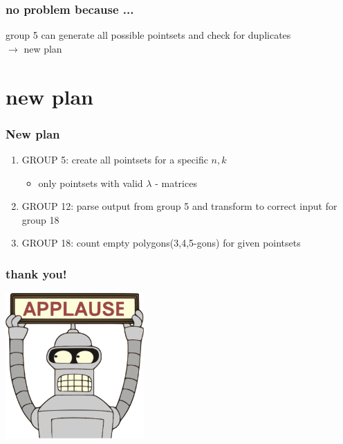 \documentclass{beamer}
\begin{document}
\begin{frame}
\frametitle{no problem because ...}
group 5 can generate all possible pointsets and check for duplicates\\
$\rightarrow$ new plan
\end{frame}

\section{new plan}
\begin{frame}
\frametitle{New plan}
\begin{enumerate}
\item GROUP 5: create all pointsets for a specific $n,k$
  \begin{itemize}
  \item only pointsets with valid $\lambda$ - matrices
  \end{itemize}
\item GROUP 12: parse output from group 5 and transform to correct input for group 18
\item GROUP 18: count empty polygons(3,4,5-gons) for given pointsets



\end{enumerate}
\end{frame}


%



\begin{frame}
\frametitle{thank you!}
\begin{center}
\vspace{2em}
\includegraphics[width=200px]{bender}
\end{center}
\end{frame}
\end{document}
